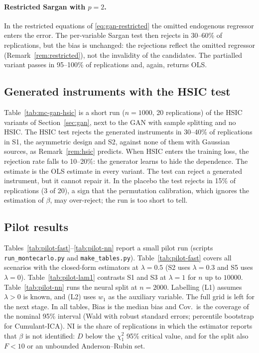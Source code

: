 \documentclass[11pt]{article}
\theoremstyle{definition}
\theoremstyle{remark}
\begin{document}
\paragraph{Restricted Sargan with $p=2$.} In the restricted equations of \eqref{eq:gan-restricted}
the omitted endogenous regressor enters the error. The per-variable Sargan test then rejects in
30--60\% of replications, but the bias is unchanged: the rejections reflect the omitted regressor
(Remark~\ref{rem:restricted}), not the invalidity of the candidates. The partialled variant
passes in 95--100\% of replications and, again, returns OLS.

\subsection{Generated instruments with the HSIC test}\label{sec:gan-hsic-mc}

Table~\ref{tab:mc-gan-hsic} is a short run ($n=1000$, 20 replications) of the HSIC variants of
Section~\ref{sec:gan}, next to the GAN with sample splitting and no HSIC. The HSIC test rejects the
generated instruments in 30--40\% of replications in S1, the asymmetric design and S2, against
none of them with Gaussian sources, as Remark~\ref{rem:hsic} predicts. When HSIC enters the
training loss, the rejection rate falls to 10--20\%: the generator learns to hide the dependence.
The estimate is the OLS estimate in every variant. The test can reject a generated instrument, but
it cannot repair it. In the placebo the test rejects in 15\% of replications (3 of 20), a sign that
the permutation calibration, which ignores the estimation of $\beta$, may over-reject; the run is
too short to tell.



\subsection{Pilot results}\label{sec:pilot}

Tables~\ref{tab:pilot-fast}--\ref{tab:pilot-nn} report a small pilot run (scripts
\texttt{run\_montecarlo.py} and \texttt{make\_tables.py}). Table~\ref{tab:pilot-fast}
covers all scenarios with the closed-form estimators at $\lambda=0.5$ (S2 uses $\lambda=0.3$ and S5 uses
$\lambda=0$). Table~\ref{tab:pilot-lam1} contrasts S1 and S3 at $\lambda=1$ for $n$ up to $10000$.
Table~\ref{tab:pilot-nn} runs the neural split at $n=2000$. Labelling (L1) assumes $\lambda>0$ is
known, and (L2) uses $w_1$ as the auxiliary variable. The full grid is left for the next stage.
In all tables, Bias is the median bias and Cov.\ is the coverage of the nominal 95\% interval (Wald
with robust standard errors; percentile bootstrap for Cumulant-ICA). NI is the share of replications
in which the estimator reports that $\beta$ is not identified: $D$ below the $\chi^2_1$ 95\%
critical value, and for the split also $F<10$ or an unbounded Anderson--Rubin set.
\end{document}
